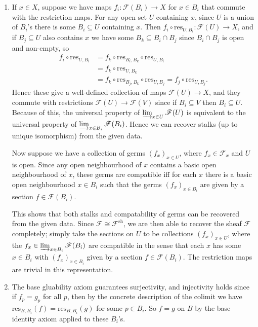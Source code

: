 \documentclass{report}
\newcommand{\sh}{{\mathrm{sh}}} %
\newcommand{\res}{{\mathrm{res}}} %
\newcommand{\colimit}{\varinjlim} %
\newcommand{\scrF}{\mathscr{F}}
\begin{document}
\begin{enumerate}[label=\textbf{2.5.\Alph*.}]
	\item If $x\in X$, suppose we have maps $f_i:\scrF(B_i)\to X$ for $x\in B_i$
	      that commute with the restriction maps. For any open set $U$ containing
	      $x$, since $U$ is a union of $B_i$'s there is some $B_i\subseteq U$
	      containing $x$. Then $f_i\circ\res_{U,B_i}:\scrF(U)\to X$, and if
	      $B_j\subseteq U$ also contains $x$ we have some
	      $B_k\subseteq B_i\cap B_j$ since $B_i\cap B_j$ is open and non-empty, so
	      \begin{align*}
		      f_i\circ\res_{U,B_i}
		       & = f_k\circ\res_{B_i,B_k}\circ\res_{U,B_i} \\
		       & = f_k\circ\res_{U,B_k}                    \\
		       & = f_k\circ\res_{B_j,B_k}\circ\res_{U,B_j}
		      = f_j\circ\res_{U,B_j}.
	      \end{align*}
	      Hence these give a well-defined collection of maps $\scrF(U)\to X$, and
	      they commute with restrictions $\scrF(U)\to\scrF(V)$ since if $B_i\subseteq V$
	      then $B_i\subseteq U$. Because of this, the universal property of
	      $\colimit_{x\in U}\scrF(U)$ is equivalent to the universal property of
	      $\colimit_{x\in B_i}\scrF(B_i)$. Hence we can recover stalks (up to
	      unique isomorphism) from the given data.

	      Now suppose we have a collection of germs $(f_x)_{x\in U}$, where
	      $f_x\in\scrF_x$ and $U$ is open. Since any open neighbourhood of $x$
	      contains a basic open neighbourhood of $x$, these germs are compatible
	      iff for each $x$ there is a basic open neighbourhood $x\in B_i$ such
	      that the germs $(f_x)_{x\in B_i}$ are given by a section $f\in\scrF(B_i)$.

	      This shows that both stalks and compatability of germs can be recovered
	      from the given data. Since $\scrF\cong\scrF^\sh$, we are then able to recover
	      the sheaf $\scrF$ completely; simply take the sections on $U$ to be
	      collections $(f_x)_{x\in U}$, where the
	      $f_x\in\colimit_{x\in B_i}\scrF(B_i)$ are compatible in the sense that each
	      $x$ has some $x\in B_i$ with $(f_x)_{x\in B_i}$ given by a section
	      $f\in\scrF(B_i)$. The restriction maps are trivial in this representation.

	\item The base gluability axiom guarantees surjectivity, and injectivity
	      holds since if $f_p=g_p$ for all $p$, then by the concrete description
	      of the colimit we have $\res_{B,B_i}(f)=\res_{B,B_i}(g)$ for some
	      $p\in B_i$. So $f=g$ on $B$ by the base identity axiom applied to these
	      $B_i$'s.


\end{enumerate}
\end{document}
